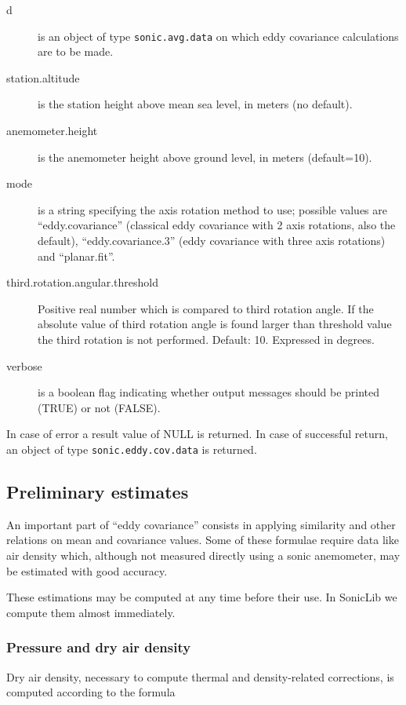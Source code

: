 \documentclass[a4paper,10pt]{book}
\begin{document}
\begin{description}
 \item[d] is an object of type \verb|sonic.avg.data| on which eddy covariance calculations are to be made.
 \item[station.altitude] is the station height above mean sea level, in meters (no default).
 \item[anemometer.height] is the anemometer height above ground level, in meters (default=10).
 \item[mode] is a string specifying the axis rotation method to use; possible values are ``eddy.covariance'' (classical eddy covariance with 2 axis rotations, also the default), ``eddy.covariance.3'' (eddy covariance with three axis rotations) and ``planar.fit''.
 \item[third.rotation.angular.threshold] Positive real number which is compared to third rotation angle. If the absolute value of third rotation angle is found larger than threshold value the third rotation is not performed. Default: 10. Expressed in degrees.
 \item[verbose] is a boolean flag indicating whether output messages should be printed (TRUE) or not (FALSE).
\end{description}

In case of error a result value of NULL is returned. In case of successful return, an object of type \verb|sonic.eddy.cov.data| is returned.

\subsection{Preliminary estimates}

An important part of ``eddy covariance'' consists in applying similarity and other relations on mean and covariance values. Some of these formulae require data like air density which, although not measured directly using a sonic anemometer, may be estimated with good accuracy.

These estimations may be computed at any time before their use. In SonicLib we compute them almost immediately.

\subsubsection{Pressure and dry air density}

Dry air density, necessary to compute thermal and density-related corrections, is computed according to the formula
\end{document}
